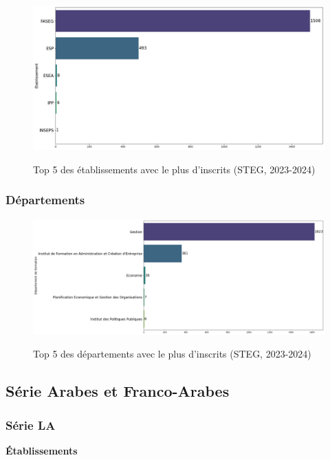 \begin{figure}[ht]
\centering
\caption{Top 5 des établissements avec le plus d'inscrits (STEG, 2023-2024)}
\includegraphics[width=1\textwidth]{figure/etab_STEG_2024.png}
\label{fig:etab_steg_2024}
\end{figure}

\subsubsection{Départements}

\begin{figure}[ht]
\centering
\caption{Top 5 des départements avec le plus d'inscrits (STEG, 2023-2024)}
\includegraphics[width=1\textwidth]{figure/dep_STEG_2024.png}
\label{fig:dep_steg_2024}
\end{figure}

\newpage
\subsection{Série Arabes et Franco-Arabes}

\subsubsection{Série LA}

\textbf{Établissements}

